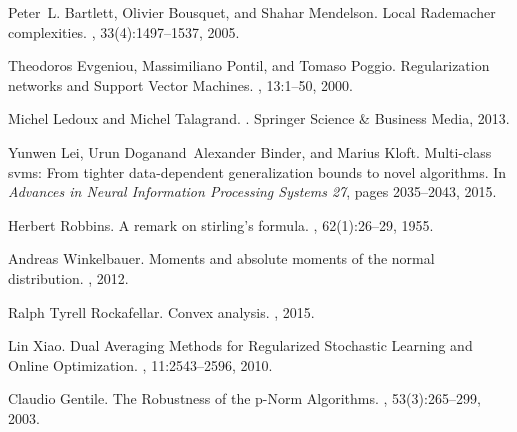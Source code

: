 \documentclass[10pt]{llncs}
\begin{document}
%
%
\begin{thebibliography}{1}
\providecommand{\url}[1]{\texttt{#1}}
\providecommand{\urlprefix}{URL }
Peter~L. Bartlett, Olivier Bousquet, and Shahar Mendelson.
\newblock Local {R}ademacher complexities.
, 33(4):1497--1537, 2005.

Theodoros Evgeniou, Massimiliano Pontil, and Tomaso Poggio.
\newblock Regularization networks and {S}upport {V}ector {M}achines.
, 13:1--50, 2000.

Michel Ledoux and Michel Talagrand.
.
\newblock Springer Science \& Business Media, 2013.

Yunwen Lei, Urun Doganand~Alexander Binder, and Marius Kloft.
\newblock Multi-class svms: From tighter data-dependent generalization bounds
  to novel algorithms.
\newblock In {\em Advances in Neural Information Processing Systems 27}, pages
  2035--2043, 2015.

Herbert Robbins.
\newblock A remark on stirling's formula.
, 62(1):26--29, 1955.

Andreas Winkelbauer.
\newblock Moments and absolute moments of the normal distribution.
, 2012.

Ralph Tyrell Rockafellar.
\newblock Convex analysis.
, 2015.

Lin Xiao.
\newblock Dual Averaging Methods for Regularized Stochastic Learning and Online Optimization.
, 11:2543--2596, 2010.

Claudio Gentile.
\newblock The Robustness of the p-Norm Algorithms.
, 53(3):265--299, 2003.

\end{thebibliography}
\end{document}
